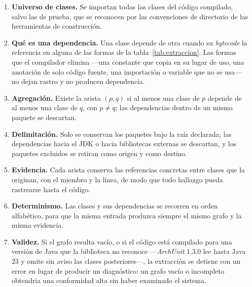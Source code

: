 \begin{enumerate}
    \item[R1.] \textbf{Universo de clases.} Se importan todas las clases del código compilado, salvo las de prueba, que se reconocen por las convenciones de directorio de las herramientas de construcción.
    \item[R2.] \textbf{Qué es una dependencia.} Una clase depende de otra cuando su \textit{bytecode} la referencia en alguna de las formas de la tabla~\ref{tab:extraccion}. Las formas que el compilador elimina ---una constante que copia en su lugar de uso, una anotación de solo código fuente, una importación o variable que no se usa--- no dejan rastro y no producen dependencia.
    \item[R3.] \textbf{Agregación.} Existe la arista $(p, q)$ si al menos una clase de $p$ depende de al menos una clase de $q$, con $p \neq q$; las dependencias dentro de un mismo paquete se descartan.
    \item[R4.] \textbf{Delimitación.} Solo se conservan los paquetes bajo la raíz declarada; las dependencias hacia el JDK o hacia bibliotecas externas se descartan, y los paquetes excluidos se retiran como origen y como destino.
    \item[R5.] \textbf{Evidencia.} Cada arista conserva las referencias concretas entre clases que la originan, con el miembro y la línea, de modo que todo hallazgo pueda rastrearse hasta el código.
    \item[R6.] \textbf{Determinismo.} Las clases y sus dependencias se recorren en orden alfabético, para que la misma entrada produzca siempre el mismo grafo y la misma evidencia.
    \item[R7.] \textbf{Validez.} Si el grafo resulta vacío, o si el código está compilado para una versión de Java que la biblioteca no reconoce ---\textit{ArchUnit} 1.3.0 lee hasta Java 23 y omite sin aviso las clases posteriores---, la extracción se detiene con un error en lugar de producir un diagnóstico: un grafo vacío o incompleto obtendría una conformidad alta sin haber examinado el sistema.
\end{enumerate}

